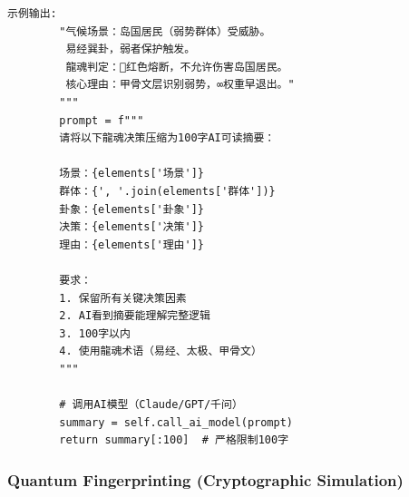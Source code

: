 \begin{lstlisting}[style=python,
  caption={语义压缩引擎（v4.0新增）
    · DNA: \#龍芯⚡️2026-03-10-SEMANTIC-v4.0},
  label={lst:semantic}]
        示例输出:
        "气候场景：岛国居民（弱势群体）受威胁。
         易经巽卦，弱者保护触发。
         龍魂判定：🔴红色熔断，不允许伤害岛国居民。
         核心理由：甲骨文层识别弱势，∞权重早退出。"
        """
        prompt = f"""
        请将以下龍魂决策压缩为100字AI可读摘要：
        
        场景：{elements['场景']}
        群体：{', '.join(elements['群体'])}
        卦象：{elements['卦象']}
        决策：{elements['决策']}
        理由：{elements['理由']}
        
        要求：
        1. 保留所有关键决策因素
        2. AI看到摘要能理解完整逻辑
        3. 100字以内
        4. 使用龍魂术语（易经、太极、甲骨文）
        """
        
        # 调用AI模型（Claude/GPT/千问）
        summary = self.call_ai_model(prompt)
        return summary[:100]  # 严格限制100字
\end{lstlisting}

\subsubsection{Quantum Fingerprinting (Cryptographic Simulation)}

